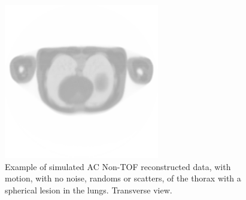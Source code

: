                 \begin{figure} %
                    \centering
                    
                    \includegraphics[width=1.0\linewidth]{figures/background_ac_example.png}
                    
                    \captionsetup{singlelinecheck=false}
                    \caption{
                        Example of simulated \gls{AC} \gls{Non-TOF} reconstructed data, with motion, with no noise, randoms or scatters, of the thorax with a spherical lesion in the lungs. Transverse view.
                    }
                    \label{fig:combined_pet_ct_ac_tof_example}
                \end{figure}
                

